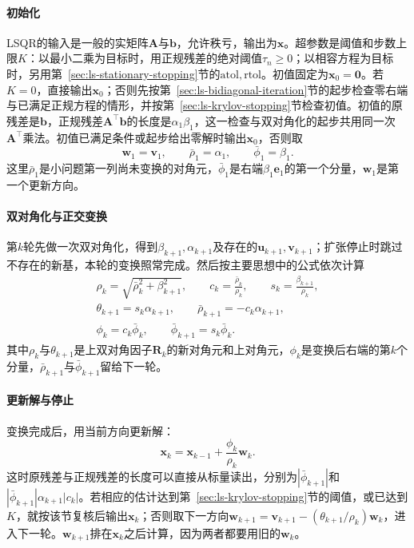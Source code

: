 \paragraph{初始化}
LSQR的输入是一般的实矩阵$\bm A$与$\bm b$，允许秩亏，输出为$\bm x$。超参数是阈值和步数上限$K$：以最小二乘为目标时，用正规残差的绝对阈值$\tau_n\ge0$；以相容方程为目标时，另用第~\ref{sec:ls-stationary-stopping}节的$\mathrm{atol},\mathrm{rtol}$。初值固定为$\bm x_0=\bm0$。若$K=0$，直接输出$\bm x_0$；否则先按第~\ref{sec:ls-bidiagonal-iteration}节的起步检查零右端与已满足正规方程的情形，并按第~\ref{sec:ls-krylov-stopping}节检查初值。初值的原残差是$\bm b$，正规残差$\bm A^\top\bm b$的长度是$\alpha_1\beta_1$，这一检查与双对角化的起步共用同一次$\bm A^\top$乘法。初值已满足条件或起步给出零解时输出$\bm x_0$，否则取
\[
 \bm w_1=\bm v_1,\qquad \bar\rho_1=\alpha_1,\qquad \bar\phi_1=\beta_1 .
\]
这里$\bar\rho_1$是小问题第一列尚未变换的对角元，$\bar\phi_1$是右端$\beta_1\bm e_1$的第一个分量，$\bm w_1$是第一个更新方向。

\paragraph{双对角化与正交变换}
第$k$轮先做一次双对角化，得到$\beta_{k+1},\alpha_{k+1}$及存在的$\bm u_{k+1},\bm v_{k+1}$；扩张停止时跳过不存在的新基，本轮的变换照常完成。然后按主要思想中的公式依次计算
\[
 \begin{gathered}
 \rho_k=\sqrt{\bar\rho_k^2+\beta_{k+1}^2},\qquad
 c_k=\frac{\bar\rho_k}{\rho_k},\qquad s_k=\frac{\beta_{k+1}}{\rho_k},\\
 \theta_{k+1}=s_k\alpha_{k+1},\qquad
 \bar\rho_{k+1}=-c_k\alpha_{k+1},\\
 \phi_k=c_k\bar\phi_k,\qquad
 \bar\phi_{k+1}=s_k\bar\phi_k .
 \end{gathered}
\]
其中$\rho_k$与$\theta_{k+1}$是上双对角因子$\bm R_k$的新对角元和上对角元，$\phi_k$是变换后右端的第$k$个分量，$\bar\rho_{k+1}$与$\bar\phi_{k+1}$留给下一轮。

\paragraph{更新解与停止}
变换完成后，用当前方向更新解：
\[
 \bm x_k=\bm x_{k-1}+\frac{\phi_k}{\rho_k}\bm w_k .
\]
这时原残差与正规残差的长度可以直接从标量读出，分别为$|\bar\phi_{k+1}|$和$|\bar\phi_{k+1}|\alpha_{k+1}|c_k|$。若相应的估计达到第~\ref{sec:ls-krylov-stopping}节的阈值，或已达到$K$，就按该节复核后输出$\bm x_k$；否则取下一方向$\bm w_{k+1}=\bm v_{k+1}-(\theta_{k+1}/\rho_k)\bm w_k$，进入下一轮。$\bm w_{k+1}$排在$\bm x_k$之后计算，因为两者都要用旧的$\bm w_k$。

